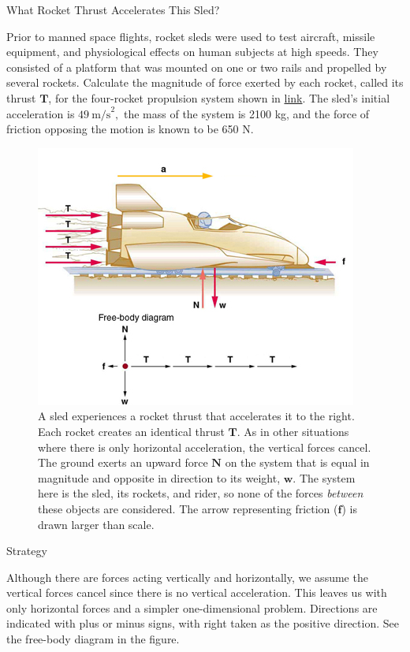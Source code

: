 \documentclass[
]{book}
\begin{document}
\hypertarget{fs-id2654781}{}
What Rocket Thrust Accelerates This Sled?

Prior to manned space flights, rocket sleds were used to test aircraft,
missile equipment, and physiological effects on human subjects at high
speeds. They consisted of a platform that was mounted on one or two
rails and propelled by several rockets. Calculate the magnitude of force
exerted by each rocket, called its thrust \(\textbf{T}{}\), for the
four-rocket propulsion system shown in
\protect\hyperlink{fs-id2407992}{link}. The sled's initial
acceleration is \({{\text{49}\ \text{m/s}^{2}},}{}\) the mass of the
system is 2100 kg, and the force of friction opposing the motion is
known to be 650 N.

\begin{figure}
\hypertarget{fs-id2407992}{%
\centering
\includegraphics{images/Figure_04_03_04.jpg}
\caption{A sled experiences a rocket thrust that accelerates it to the right.
Each rocket creates an identical thrust \(\textbf{T}{}\). As in other
situations where there is only horizontal acceleration, the vertical
forces cancel. The ground exerts an upward force \(\textbf{N}{}\) on the
system that is equal in magnitude and opposite in direction to its
weight, \(\textbf{w}{}\). The system here is the sled, its rockets, and
rider, so none of the forces \emph{between} these objects are considered. The
arrow representing friction (\(\textbf{f}{}\)) is drawn larger than
scale.}\label{fs-id2407992}
}
\end{figure}

{Strategy}

Although there are forces acting vertically and horizontally, we assume
the vertical forces cancel since there is no vertical acceleration. This
leaves us with only horizontal forces and a simpler one-dimensional
problem. Directions are indicated with plus or minus signs, with right
taken as the positive direction. See the free-body diagram in the
figure.
\end{document}
